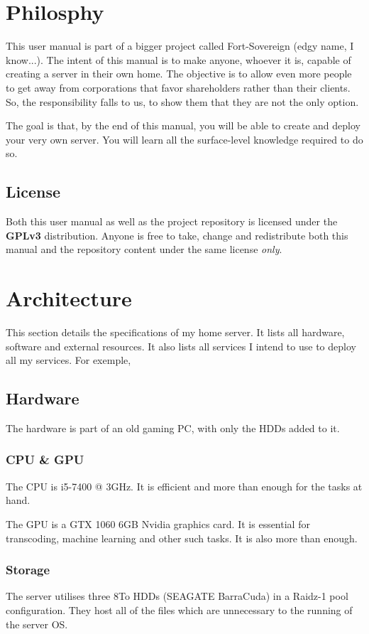 \section{Philosphy}
This user manual is part of a bigger project called Fort-Sovereign (edgy name, I know...).
The intent of this manual is to make anyone, whoever it is, capable of creating a server in their own home.
The objective is to allow even more people to get away from corporations that favor shareholders rather than their clients.
So, the responsibility falls to us, to show them that they are not the only option. 

The goal is that, by the end of this manual, you will be able to create and deploy your very own server. 
You will learn all the surface-level knowledge required to do so. \\


\subsection{License}
Both this user manual as well as the project repository is licensed under the \textbf{GPLv3} distribution.
Anyone is free to take, change and redistribute both this manual and the repository content under the same license \textit{only}.

\section{Architecture}
This section details the specifications of my home server. 
It lists all hardware, software and external resources. 
It also lists all services I intend to use to deploy all my services. 
For exemple, 


\subsection{Hardware}
The hardware is part of an old gaming PC, with only the HDDs added to it.
\subsubsection{CPU \& GPU}
The CPU is i5-7400 @ 3GHz. It is efficient and more than enough for the tasks at hand.

The GPU is a GTX 1060 6GB Nvidia graphics card. It is essential for transcoding, machine learning and other such tasks. It is also more than enough.

\subsubsection{Storage}
The server utilises three 8\unit{To} HDDs (SEAGATE BarraCuda) in a Raidz-1 pool configuration.
They host all of the files which are unnecessary to the running of the server OS.

